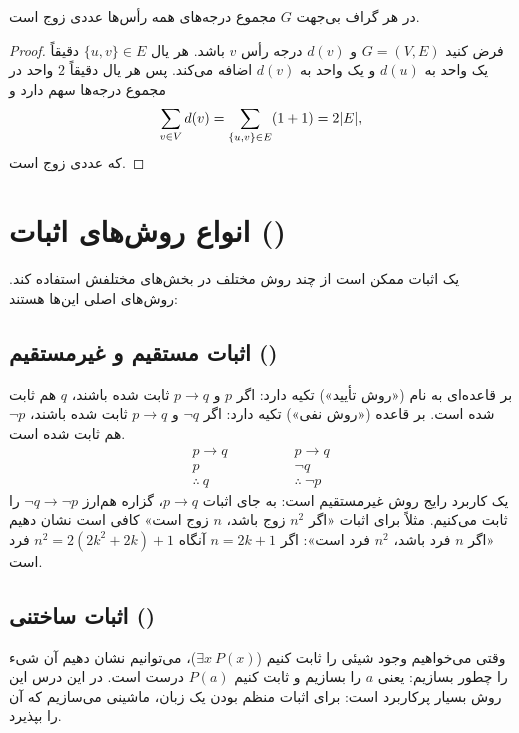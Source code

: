 \begin{theorem}\label{thm:degree}
در هر گراف بی‌جهت $G$ مجموع درجه‌های همه رأس‌ها عددی زوج است.
\end{theorem}
\begin{proof}
فرض کنید $G=(V,E)$ و $d(v)$ درجه رأس $v$ باشد. هر یال $\{u,v\}\in E$ دقیقاً یک واحد به $d(u)$ و یک واحد به $d(v)$ اضافه می‌کند. پس هر یال دقیقاً $2$ واحد در مجموع درجه‌ها سهم دارد و
\[\sum_{v\in V}d(v)=\sum_{\{u,v\}\in E}(1+1)=2\lvert E\rvert,\]
که عددی زوج است.
\end{proof}

\section{انواع روش‌های اثبات ()}

یک اثبات ممکن است از چند روش مختلف در بخش‌های مختلفش استفاده کند. روش‌های اصلی این‌ها هستند:

\subsection{اثبات مستقیم و غیرمستقیم ()}
 بر قاعده‌ای به نام  («روش تأیید») تکیه دارد: اگر $p$ و $p\rightarrow q$ ثابت شده باشند، $q$ هم ثابت شده است.
 بر قاعده  («روش نفی») تکیه دارد: اگر $\neg q$ و $p\rightarrow q$ ثابت شده باشند، $\neg p$ هم ثابت شده است.
\[
\begin{array}{l} p\rightarrow q\\ p\\ \hline \therefore\ q\end{array}
\qquad\qquad
\begin{array}{l} p\rightarrow q\\ \neg q\\ \hline \therefore\ \neg p\end{array}
\]
یک کاربرد رایج روش غیرمستقیم  است: به جای اثبات $p\rightarrow q$، گزاره هم‌ارز $\neg q\rightarrow\neg p$ را ثابت می‌کنیم. مثلاً برای اثبات «اگر $n^2$ زوج باشد، $n$ زوج است» کافی است نشان دهیم «اگر $n$ فرد باشد، $n^2$ فرد است»: اگر $n=2k+1$ آنگاه $n^2=2(2k^2+2k)+1$ فرد است.

\subsection{اثبات ساختنی ()}
وقتی می‌خواهیم وجود شیئی را ثابت کنیم ($\exists x\ P(x)$)، می‌توانیم نشان دهیم آن شیء را چطور بسازیم: یعنی $a$ را بسازیم و ثابت کنیم $P(a)$ درست است. در این درس این روش بسیار پرکاربرد است: برای اثبات منظم بودن یک زبان، ماشینی می‌سازیم که آن را بپذیرد.


